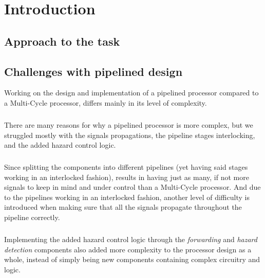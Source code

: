 \chapter{Introduction}


\section{Approach to the task}\label{intro:approach}


\section{Challenges with pipelined design}

Working on the design and implementation of a pipelined processor compared to a
Multi-Cycle processor, differs mainly in its level of complexity.
\paragraph*{}
There are many reasons for why a pipelined processor is more complex, but we
struggled mostly with the signals propagations, the pipeline stages
interlocking, and the added hazard control logic.
\paragraph*{}
Since splitting the components into different pipelines (yet having said stages
working in an interlocked fashion), results in having just as many, if not more
signals to keep in mind and under control than a Multi-Cycle processor. And due
to the pipelines working in an interlocked fashion, another level of difficulty
is introduced when making sure that all the signals propagate throughout the
pipeline correctly.
\paragraph*{}
Implementing the added hazard control logic through the \emph{forwarding} and
\emph{hazard detection} components also added more complexity to the processor
design as a whole, instead of simply being new components containing complex
circuitry and logic.
